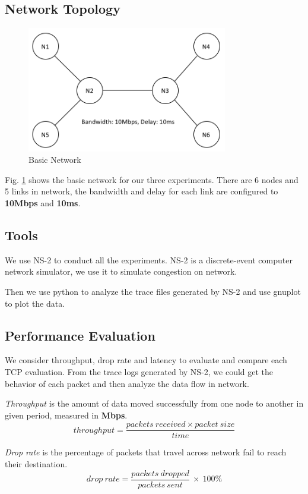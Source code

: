 \documentclass[10pt, conference]{IEEEtran}
\begin{document}
	\subsection{Network Topology}
	\begin{figure}[H]
		\centering
		\includegraphics[width=3.45in]{imgs/pic1.png}
		\caption[Optional caption]{Basic Network}
		\label{fig:1}
	\end{figure}
	Fig. \ref{fig:1} shows the basic network for our three experiments. There are 6 nodes and 5 links in network, the bandwidth and delay for each link are configured to \textbf{10Mbps} and \textbf{10ms}.
	
	\subsection{Tools}
	We use NS-2 to conduct all the experiments. NS-2 is a discrete-event computer network simulator, we use it to simulate congestion on network.
	
	Then we use python to analyze the trace files generated by NS-2 and use gnuplot to plot the data.
	
	\subsection{Performance Evaluation}
	We consider throughput, drop rate and latency to evaluate and compare each TCP evaluation. From the trace logs generated by NS-2, we could get the behavior of each packet and then analyze the data flow in network. 
	
	\textit{Throughput} is the amount of data moved successfully from one node to another in given period, measured in \textbf{Mbps}.
	$$ throughput = \frac{packets \ received \times packet \ size}{time} $$
	
	\textit{Drop rate} is the percentage of packets that travel across network fail to reach their destination.
	$$ drop \ rate = \frac{packets \ dropped}{packets \ sent} \ \times \ 100\%$$
	
\end{document}
